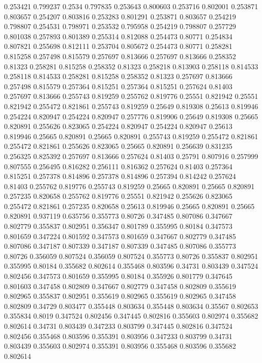 0.253421 0.799237
0.2534 0.797835
0.253643 0.800603
0.253716 0.802001
0.253871 0.803657
0.254207 0.803816
0.253283 0.801291
0.253871 0.803657
0.254219 0.798807
0.254531 0.798971
0.253532 0.795958
0.254219 0.798807
0.257729 0.801038
0.257893 0.801389
0.255314 0.812088
0.254473 0.80771
0.254834 0.807821
0.255698 0.812111
0.253704 0.805672
0.254473 0.80771
0.258281 0.815258
0.257498 0.815579
0.257697 0.813666
0.257697 0.813666
0.258352 0.81323
0.258281 0.815258
0.258352 0.81323
0.258218 0.813903
0.258118 0.814533
0.258118 0.814533
0.258281 0.815258
0.258352 0.81323
0.257697 0.813666
0.257498 0.815579
0.257364 0.815251
0.257364 0.815251
0.257624 0.81403
0.257697 0.813666
0.255743 0.819259
0.255762 0.819776
0.25551 0.821942
0.25551 0.821942
0.255472 0.821861
0.255743 0.819259
0.25649 0.819308
0.25613 0.819946
0.254224 0.820947
0.254224 0.820947
0.257776 0.819906
0.25649 0.819308
0.25665 0.820891
0.255626 0.823065
0.254224 0.820947
0.254224 0.820947
0.25613 0.819946
0.25665 0.820891
0.25665 0.820891
0.255743 0.819259
0.255472 0.821861
0.255472 0.821861
0.255626 0.823065
0.25665 0.820891
0.256639 0.831235
0.256325 0.825392
0.257697 0.813666
0.257624 0.81403
0.25791 0.807916
0.257999 0.807555
0.256495 0.816282
0.256111 0.816362
0.257624 0.81403
0.257364 0.815251
0.257378 0.814896
0.257378 0.814896
0.257394 0.814242
0.257624 0.81403
0.255762 0.819776
0.255743 0.819259
0.25665 0.820891
0.25665 0.820891
0.257235 0.820658
0.255762 0.819776
0.25551 0.821942
0.255626 0.823065
0.255472 0.821861
0.257235 0.820658
0.25613 0.819946
0.25665 0.820891
0.25665 0.820891
0.937119 0.635756
0.355773 0.80726
0.347485 0.807086
0.347667 0.802779
0.355837 0.802951
0.356347 0.801789
0.355995 0.80184
0.347573 0.801659
0.347224 0.801592
0.347573 0.801659
0.347667 0.802779
0.347485 0.807086
0.347187 0.807339
0.347187 0.807339
0.347485 0.807086
0.355773 0.80726
0.356059 0.807524
0.356059 0.807524
0.355773 0.80726
0.355837 0.802951
0.355995 0.80184
0.355682 0.802614
0.355468 0.803596
0.34731 0.803439
0.347524 0.802456
0.347573 0.801659
0.355995 0.80184
0.355926 0.801779
0.347645 0.801603
0.347458 0.802809
0.347667 0.802779
0.347458 0.802809
0.355619 0.802965
0.355837 0.802951
0.355619 0.802965
0.355619 0.802965
0.347458 0.802809
0.34729 0.803477
0.355448 0.803634
0.355448 0.803634
0.35567 0.802653
0.355834 0.8019
0.347524 0.802456
0.347445 0.802816
0.355603 0.802974
0.355682 0.802614
0.34731 0.803439
0.347233 0.803799
0.347445 0.802816
0.347524 0.802456
0.355468 0.803596
0.355391 0.803956
0.347233 0.803799
0.34731 0.803439
0.355603 0.802974
0.355391 0.803956
0.355468 0.803596
0.355682 0.802614
